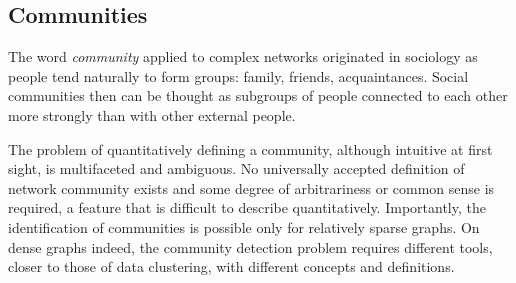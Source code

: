 \subsection{Communities}\label{sec:communities}
The word \emph{community} applied to complex networks originated in sociology as people tend naturally to form groups: family, friends, acquaintances.
Social communities then can be thought as subgroups of people connected to each other more strongly than with other external people.

The problem of quantitatively defining a community, although intuitive at first sight, is multifaceted and ambiguous.
No universally accepted definition of network community exists and some degree of arbitrariness or common sense is required, a feature that is difficult to describe quantitatively.
Importantly, the identification of communities is possible only for relatively sparse graphs. On dense graphs indeed, the community detection problem requires different tools, closer to those of data clustering, with different concepts and definitions.


